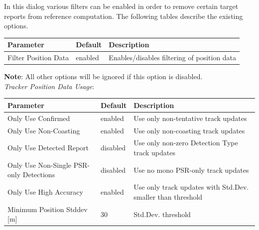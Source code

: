 
In this dialog various filters can be enabled in order to remove certain target reports from reference computation. 
The following tables describe the existing options.

\begin{table}[H]
    \center
    \begin{tabularx}{\textwidth}{ | l | l | X |}
        \hline
        \textbf{Parameter} & \textbf{Default} & \textbf{Description} \\ \hline
        Filter Position Data & enabled & Enables/disables filtering of position data \\ \hline
    \end{tabularx}
\end{table}

\textbf{Note}: All other options will be ignored if this option is disabled. \\

\textit{Tracker Position Data Usage}:
\begin{table}[H]
    \center
    \begin{tabularx}{\textwidth}{ | l | l | X |}
        \hline
        \textbf{Parameter} & \textbf{Default} & \textbf{Description} \\ \hline
        Only Use Confirmed & enabled & Use only non-tentative track updates \\ \hline
        Only Use Non-Coasting & enabled & Use only non-coasting track updates \\ \hline
        Only Use Detected Report & disabled & Use only non-zero Detection Type track updates \\ \hline
        Only Use Non-Single PSR-only Detections & disabled & Use no mono PSR-only track updates \\ \hline
        Only Use High Accuracy & enabled & Use only track updates with Std.Dev. smaller than threshold \\ \hline
        Minimum Position Stddev [m] & 30 & Std.Dev. threshold \\ \hline
    \end{tabularx}
\end{table}

